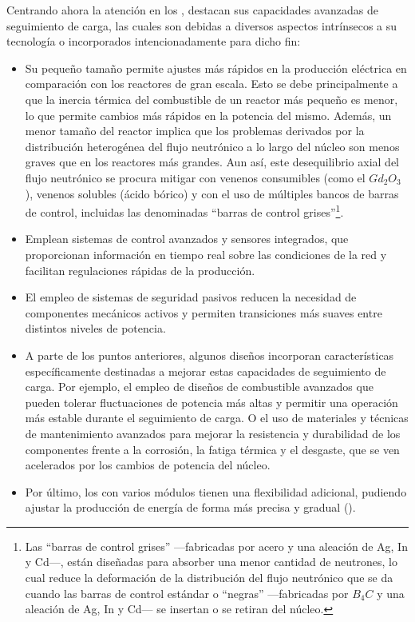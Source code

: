 Centrando ahora la atención en los , destacan sus capacidades avanzadas de seguimiento de carga, las cuales son debidas a diversos aspectos intrínsecos a su tecnología o incorporados intencionadamente para dicho fin:
\begin{itemize}
  \item Su pequeño tamaño permite ajustes más rápidos en la producción eléctrica en comparación con los reactores de gran escala. Esto se debe principalmente a que la inercia térmica del combustible de un reactor más pequeño es menor, lo que permite cambios más rápidos en la potencia del mismo. Además, un menor tamaño del reactor implica que los problemas derivados por la distribución heterogénea del flujo neutrónico a lo largo del núcleo son menos graves que en los reactores más grandes. Aun así, este desequilibrio axial del flujo neutrónico se procura mitigar con venenos consumibles (como el $Gd_2O_3$), venenos solubles (ácido bórico) y con el uso de múltiples bancos de barras de control, incluidas las denominadas ``barras de control grises''\footnote{Las ``barras de control grises'' ---fabricadas por acero y una aleación de Ag, In y Cd---, están diseñadas para absorber una menor cantidad de neutrones, lo cual reduce la deformación de la distribución del flujo neutrónico que se da cuando las barras de control estándar o ``negras'' ---fabricadas por $B_4C$ y una aleación de Ag, In y Cd--- se insertan o se retiran del núcleo.}.
  \item Emplean sistemas de control avanzados y sensores integrados, que proporcionan información en tiempo real sobre las condiciones de la red y facilitan regulaciones rápidas de la producción.
  \item El empleo de sistemas de seguridad pasivos reducen la necesidad de componentes mecánicos activos y permiten transiciones más suaves entre distintos niveles de potencia.
  \item A parte de los puntos anteriores, algunos diseños incorporan características específicamente destinadas a mejorar estas capacidades de seguimiento de carga. Por ejemplo, el empleo de diseños de combustible avanzados que pueden tolerar fluctuaciones de potencia más altas y permitir una operación más estable durante el seguimiento de carga. O el uso de materiales y técnicas de mantenimiento avanzados para mejorar la resistencia y durabilidad de los componentes frente a la corrosión, la fatiga térmica y el desgaste, que se ven acelerados por los cambios de potencia del núcleo.
  \item Por último, los  con varios módulos tienen una flexibilidad adicional, pudiendo ajustar la producción de energía de forma más precisa y gradual (\cite{smr_load_following_capabilities}).
\end{itemize}

